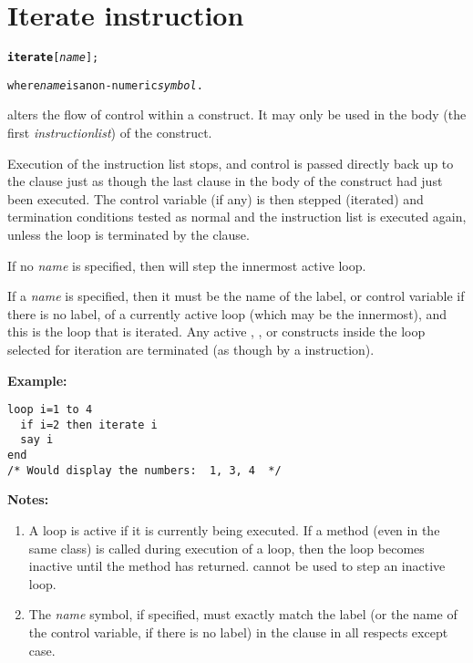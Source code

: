 \chapter{Iterate instruction}
\index{,}
\begin{shaded}
\begin{alltt}
\textbf{iterate} [\emph{name}];

where \emph{name} is a non-numeric \emph{symbol}.
\end{alltt}
\end{shaded}
  alters the flow of control within a 
construct.
It may only be used in the body (the first \emph{instructionlist})
of the construct.

Execution of the instruction list stops, and control is passed
directly back up to the  clause just as though the last
clause in the body of the construct had just been executed.
The control variable (if any) is then stepped (iterated) and termination
conditions tested as normal and the instruction list is executed again,
unless the loop is terminated by the  clause.

If no \emph{name} is specified, then  will step
the innermost active loop.
 
If a \emph{name} is specified, then it must be the name of the
label, or control variable if there is no label, of a currently active
loop (which may be the innermost), and this is the loop that is
iterated.
Any active , , or  constructs
inside the loop selected for iteration are terminated (as though by a
 instruction).

\textbf{Example:}
\begin{lstlisting}
loop i=1 to 4
  if i=2 then iterate i
  say i
end
/* Would display the numbers:  1, 3, 4  */
\end{lstlisting}
 \textbf{Notes:}
\begin{enumerate}
\item A loop is active if it is currently being executed.
If a method (even in the same class) is called during execution of a
loop, then the loop becomes inactive until the method has returned.
 cannot be used to step an inactive loop.
\item The \emph{name} symbol, if specified, must exactly match the
label (or the name of the control variable, if there is no label) in the
 clause in all respects except case.
\end{enumerate}
